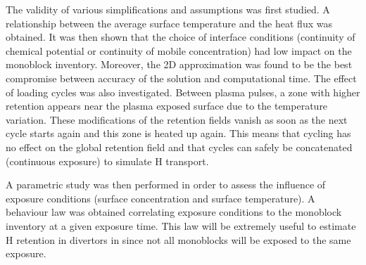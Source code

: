 The validity of various simplifications and assumptions was first studied.
A relationship between the average surface temperature and the heat flux was obtained.
It was then shown that the choice of interface conditions (continuity of chemical potential or continuity of mobile concentration) had low impact on the monoblock inventory.
Moreover, the 2D approximation was found to be the best compromise between accuracy of the solution and computational time.
The effect of loading cycles was also investigated.
Between plasma pulses, a zone with higher retention appears near the plasma exposed surface due to the temperature variation.
These modifications of the retention fields vanish as soon as the next cycle starts again and this zone is heated up again.
This means that cycling has no effect on the global retention field and that cycles can safely be concatenated (continuous exposure) to simulate H transport.

A parametric study was then performed in order to assess the influence of exposure conditions (surface concentration and surface temperature).
A behaviour law was obtained correlating exposure conditions to the monoblock inventory at a given exposure time.
This law will be extremely useful to estimate H retention in divertors in  since not all monoblocks will be exposed to the same exposure.
